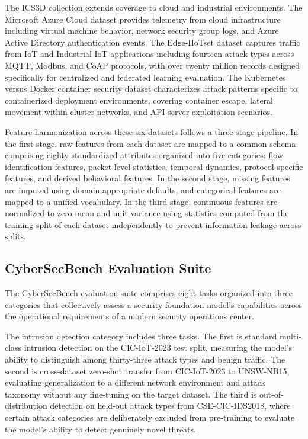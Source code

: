 \documentclass[journal]{IEEEtran}
\newcommand{\benchname}{CyberSecBench}
\begin{document}
The ICS3D collection extends coverage to cloud and industrial environments. The Microsoft Azure Cloud dataset provides telemetry from cloud infrastructure including virtual machine behavior, network security group logs, and Azure Active Directory authentication events. The Edge-IIoTset dataset captures traffic from IoT and Industrial IoT applications including fourteen attack types across MQTT, Modbus, and CoAP protocols, with over twenty million records designed specifically for centralized and federated learning evaluation. The Kubernetes versus Docker container security dataset characterizes attack patterns specific to containerized deployment environments, covering container escape, lateral movement within cluster networks, and API server exploitation scenarios.

Feature harmonization across these six datasets follows a three-stage pipeline. In the first stage, raw features from each dataset are mapped to a common schema comprising eighty standardized attributes organized into five categories: flow identification features, packet-level statistics, temporal dynamics, protocol-specific features, and derived behavioral features. In the second stage, missing features are imputed using domain-appropriate defaults, and categorical features are mapped to a unified vocabulary. In the third stage, continuous features are normalized to zero mean and unit variance using statistics computed from the training split of each dataset independently to prevent information leakage across splits.

\subsection{CyberSecBench Evaluation Suite}
\label{subsec:benchmark}

The \benchname{} evaluation suite comprises eight tasks organized into three categories that collectively assess a security foundation model's capabilities across the operational requirements of a modern security operations center.

The intrusion detection category includes three tasks. The first is standard multi-class intrusion detection on the CIC-IoT-2023 test split, measuring the model's ability to distinguish among thirty-three attack types and benign traffic. The second is cross-dataset zero-shot transfer from CIC-IoT-2023 to UNSW-NB15, evaluating generalization to a different network environment and attack taxonomy without any fine-tuning on the target dataset. The third is out-of-distribution detection on held-out attack types from CSE-CIC-IDS2018, where certain attack categories are deliberately excluded from pre-training to evaluate the model's ability to detect genuinely novel threats.
\end{document}
